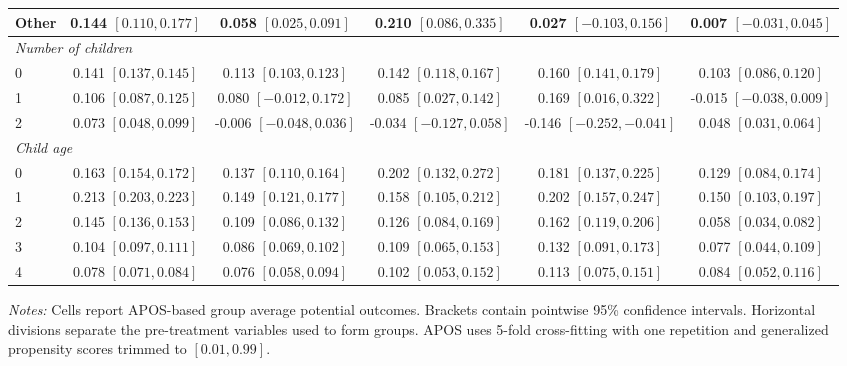 \begin{landscape}
\begin{longtable}{lccccc}
Other & 0.144 {\scriptsize$[0.110,0.177]$} & 0.058 {\scriptsize$[0.025,0.091]$} & 0.210 {\scriptsize$[0.086,0.335]$} & 0.027 {\scriptsize$[-0.103,0.156]$} & 0.007 {\scriptsize$[-0.031,0.045]$} \\
\midrule
\multicolumn{6}{l}{\textit{Number of children}} \\
0 & 0.141 {\scriptsize$[0.137,0.145]$} & 0.113 {\scriptsize$[0.103,0.123]$} & 0.142 {\scriptsize$[0.118,0.167]$} & 0.160 {\scriptsize$[0.141,0.179]$} & 0.103 {\scriptsize$[0.086,0.120]$} \\
1 & 0.106 {\scriptsize$[0.087,0.125]$} & 0.080 {\scriptsize$[-0.012,0.172]$} & 0.085 {\scriptsize$[0.027,0.142]$} & 0.169 {\scriptsize$[0.016,0.322]$} & -0.015 {\scriptsize$[-0.038,0.009]$} \\
2 & 0.073 {\scriptsize$[0.048,0.099]$} & -0.006 {\scriptsize$[-0.048,0.036]$} & -0.034 {\scriptsize$[-0.127,0.058]$} & -0.146 {\scriptsize$[-0.252,-0.041]$} & 0.048 {\scriptsize$[0.031,0.064]$} \\
\midrule
\multicolumn{6}{l}{\textit{Child age}} \\
0 & 0.163 {\scriptsize$[0.154,0.172]$} & 0.137 {\scriptsize$[0.110,0.164]$} & 0.202 {\scriptsize$[0.132,0.272]$} & 0.181 {\scriptsize$[0.137,0.225]$} & 0.129 {\scriptsize$[0.084,0.174]$} \\
1 & 0.213 {\scriptsize$[0.203,0.223]$} & 0.149 {\scriptsize$[0.121,0.177]$} & 0.158 {\scriptsize$[0.105,0.212]$} & 0.202 {\scriptsize$[0.157,0.247]$} & 0.150 {\scriptsize$[0.103,0.197]$} \\
2 & 0.145 {\scriptsize$[0.136,0.153]$} & 0.109 {\scriptsize$[0.086,0.132]$} & 0.126 {\scriptsize$[0.084,0.169]$} & 0.162 {\scriptsize$[0.119,0.206]$} & 0.058 {\scriptsize$[0.034,0.082]$} \\
3 & 0.104 {\scriptsize$[0.097,0.111]$} & 0.086 {\scriptsize$[0.069,0.102]$} & 0.109 {\scriptsize$[0.065,0.153]$} & 0.132 {\scriptsize$[0.091,0.173]$} & 0.077 {\scriptsize$[0.044,0.109]$} \\
4 & 0.078 {\scriptsize$[0.071,0.084]$} & 0.076 {\scriptsize$[0.058,0.094]$} & 0.102 {\scriptsize$[0.053,0.152]$} & 0.113 {\scriptsize$[0.075,0.151]$} & 0.084 {\scriptsize$[0.052,0.116]$} \\
\end{longtable}
\par\vspace{3pt}
\begin{minipage}{\linewidth}\footnotesize \textit{Notes:} Cells report APOS-based group average potential outcomes. Brackets contain pointwise 95\% confidence intervals. Horizontal divisions separate the pre-treatment variables used to form groups. APOS uses 5-fold cross-fitting with one repetition and generalized propensity scores trimmed to $[0.01,0.99]$.\end{minipage}
\end{landscape}
